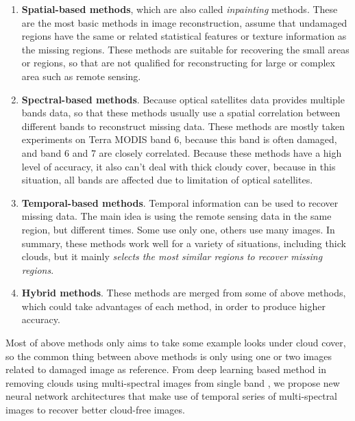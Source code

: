 \begin{enumerate}
	\item \textbf{Spatial-based methods}, which are also called \textit{inpainting} methods. These are the most basic methods in image reconstruction, assume that undamaged regions have the same or related statistical features or texture information as the missing regions. These methods are suitable for recovering the small areas or regions, so that are not qualified for reconstructing for large or complex area such as remote sensing.
	
	\item \textbf{Spectral-based methods}. Because optical satellites data provides multiple bands data, so that these methods usually use a spatial correlation between different bands to reconstruct missing data. These methods are mostly taken experiments on Terra MODIS band 6, because this band is often damaged, and band 6 and 7 are closely correlated. Because these methods have a high level of accuracy, it also can't deal with thick cloudy cover, because in this situation, all bands are affected due to limitation of optical satellites.
	
	\item \textbf{Temporal-based methods}. Temporal information can be used to recover missing data. The main idea is using the remote sensing data in the same region, but different times. Some use only one, others use many images. In summary, these methods work well for a variety of situations, including thick clouds, but it mainly \textit{selects the most similar regions to recover missing regions}.
	
	\item \textbf{Hybrid methods}. These methods are merged from some of above methods, which could take advantages of each method, in order to produce higher accuracy. 
\end{enumerate}

Most of above methods only aims to take some example looks under cloud cover, so the common thing between above methods is only using one or two images related to damaged image as reference. From deep learning based method in removing clouds using multi-spectral images from single band  \cite{Zhang2018}, we propose new neural network architectures that make use of temporal series of multi-spectral images to recover better cloud-free images.

